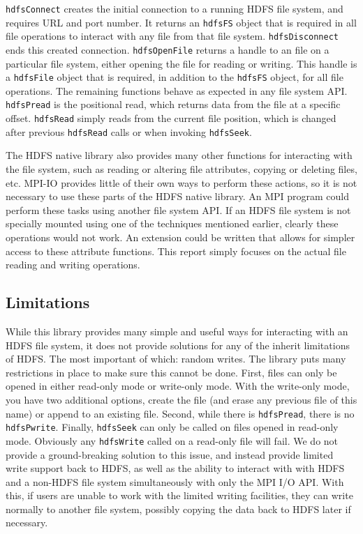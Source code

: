 \texttt{hdfsConnect} creates the initial connection to a running HDFS file
system, and requires URL and port number. It returns an \texttt{hdfsFS} object
that is required in all file operations to interact with any file from that file
system. \texttt{hdfsDisconnect} ends this created connection.
\texttt{hdfsOpenFile} returns a handle to an file on a particular file system,
either opening the file for reading or writing. This handle is a
\texttt{hdfsFile} object that is required, in addition to the \texttt{hdfsFS}
object, for all file operations. The remaining functions behave as expected in
any file system API. \texttt{hdfsPread} is the positional read, which returns
data from the file at a specific offset. \texttt{hdfsRead} simply reads from the
current file position, which is changed after previous \texttt{hdfsRead} calls
or when invoking \texttt{hdfsSeek}.

The HDFS native library also provides many other functions for interacting with
the file system, such as reading or altering file attributes, copying or
deleting files, etc. MPI-IO provides little of their own ways to perform these
actions, so it is not necessary to use these parts of the HDFS native library.
An MPI program could perform these tasks using another file system API. If an
HDFS file system is not specially mounted using one of the techniques mentioned
earlier, clearly these operations would not work. An extension could be written
that allows for simpler access to these attribute functions. This
report simply
focuses on the actual file reading and writing operations.

\subsection{Limitations}
While this library provides many simple and useful ways for interacting with an
HDFS file system, it does not provide solutions for any of the inherit
limitations of HDFS. The most important of which: random writes. The library
puts many restrictions in place to make sure this cannot be done. First, files
can only be opened in either read-only mode or write-only mode. With the
write-only mode, you have two additional options, create the file (and erase any
previous file of this name) or append to an existing file. Second, while there
is \texttt{hdfsPread}, there is no \texttt{hdfsPwrite}. Finally,
\texttt{hdfsSeek} can only be called on files opened in read-only mode.
Obviously any \texttt{hdfsWrite} called on a read-only file will fail. We do not
provide a ground-breaking solution to this issue, and instead provide limited
write support back to HDFS, as well as the ability to interact with with HDFS
and a non-HDFS file system simultaneously with only the MPI I/O API. With this,
if users are unable to work with the limited writing facilities, they can write
normally to another file system, possibly copying the data back to HDFS later if
necessary.

